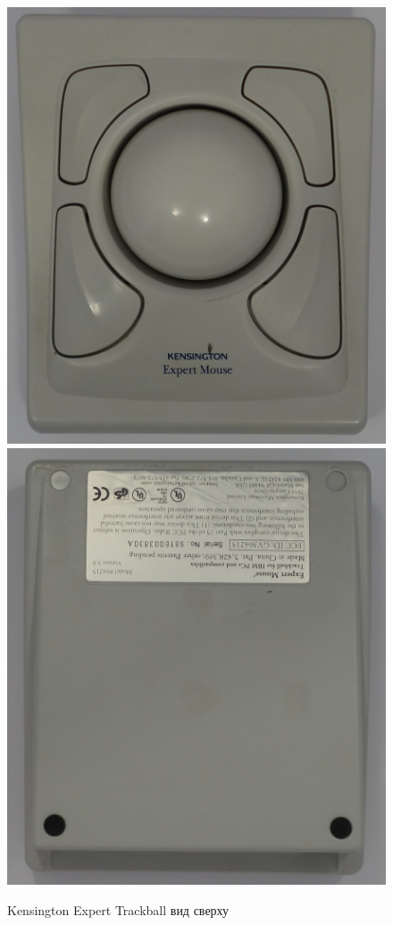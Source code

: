 \documentclass[11pt, a4paper]{article}
\begin{document}
\begin{figure}[h]
    \centering
    \includegraphics[scale=0.5]{1996_kensington_expert_trackball_5/kingup.JPG}
    \includegraphics[scale=0.5]{1996_kensington_expert_trackball_5/kingdown.JPG}
    \caption{Kensington Expert Trackball вид сверху}
    \label{fig:top}
\end{figure}
\end{document}
